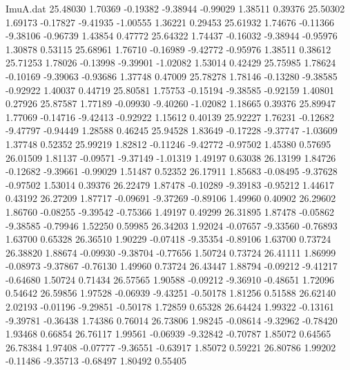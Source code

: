 \begin{filecontents}{ImuA.dat}
  25.48030    1.70369   -0.19382   -9.38944   -0.99029    1.38511    0.39376
  25.50302    1.69173   -0.17827   -9.41935   -1.00555    1.36221    0.29453
  25.61932    1.74676   -0.11366   -9.38106   -0.96739    1.43854    0.47772
  25.64322    1.74437   -0.16032   -9.38944   -0.95976    1.30878    0.53115
  25.68961    1.76710   -0.16989   -9.42772   -0.95976    1.38511    0.38612
  25.71253    1.78026   -0.13998   -9.39901   -1.02082    1.53014    0.42429
  25.75985    1.78624   -0.10169   -9.39063   -0.93686    1.37748    0.47009
  25.78278    1.78146   -0.13280   -9.38585   -0.92922    1.40037    0.44719
  25.80581    1.75753   -0.15194   -9.38585   -0.92159    1.40801    0.27926
  25.87587    1.77189   -0.09930   -9.40260   -1.02082    1.18665    0.39376
  25.89947    1.77069   -0.14716   -9.42413   -0.92922    1.15612    0.40139
  25.92227    1.76231   -0.12682   -9.47797   -0.94449    1.28588    0.46245
  25.94528    1.83649   -0.17228   -9.37747   -1.03609    1.37748    0.52352
  25.99219    1.82812   -0.11246   -9.42772   -0.97502    1.45380    0.57695
  26.01509    1.81137   -0.09571   -9.37149   -1.01319    1.49197    0.63038
  26.13199    1.84726   -0.12682   -9.39661   -0.99029    1.51487    0.52352
  26.17911    1.85683   -0.08495   -9.37628   -0.97502    1.53014    0.39376
  26.22479    1.87478   -0.10289   -9.39183   -0.95212    1.44617    0.43192
  26.27209    1.87717   -0.09691   -9.37269   -0.89106    1.49960    0.40902
  26.29602    1.86760   -0.08255   -9.39542   -0.75366    1.49197    0.49299
  26.31895    1.87478   -0.05862   -9.38585   -0.79946    1.52250    0.59985
  26.34203    1.92024   -0.07657   -9.33560   -0.76893    1.63700    0.65328
  26.36510    1.90229   -0.07418   -9.35354   -0.89106    1.63700    0.73724
  26.38820    1.88674   -0.09930   -9.38704   -0.77656    1.50724    0.73724
  26.41111    1.86999   -0.08973   -9.37867   -0.76130    1.49960    0.73724
  26.43447    1.88794   -0.09212   -9.41217   -0.64680    1.50724    0.71434
  26.57565    1.90588   -0.09212   -9.36910   -0.48651    1.72096    0.54642
  26.59856    1.97528   -0.06939   -9.43251   -0.50178    1.81256    0.51588
  26.62140    2.02193   -0.01196   -9.29851   -0.50178    1.72859    0.65328
  26.64424    1.99322   -0.13161   -9.39781   -0.36438    1.74386    0.76014
  26.73806    1.98245   -0.08614   -9.32962   -0.78420    1.93468    0.66854
  26.76117    1.99561   -0.06939   -9.32842   -0.70787    1.85072    0.64565
  26.78384    1.97408   -0.07777   -9.36551   -0.63917    1.85072    0.59221
  26.80786    1.99202   -0.11486   -9.35713   -0.68497    1.80492    0.55405

\end{filecontents}

